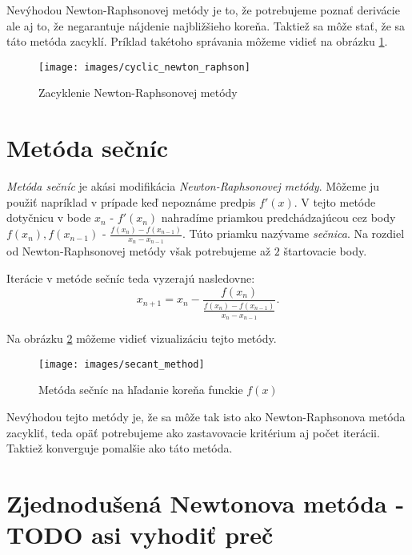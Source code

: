 Nevýhodou Newton-Raphsonovej metódy je to, že potrebujeme poznať derivácie ale aj to, že negarantuje nájdenie
najbližšieho koreňa. Taktiež sa môže stať, že sa táto metóda zacyklí. Príklad takétoho správania môžeme vidieť
na obrázku \ref{obr:cyclic_newton_raphson}.

\begin{figure}
    \centerline{\texttt{[image: images/cyclic\_newton\_raphson]}}
    \caption[Zacyklenie Newton-Raphsonovej metódy]{Zacyklenie Newton-Raphsonovej metódy}
    \label{obr:cyclic_newton_raphson}
\end{figure}

\section{Metóda sečníc}

\textit{Metóda sečníc} je akási modifikácia \textit{Newton-Raphsonovej metódy}. 
Môžeme ju použiť napríklad v prípade keď nepoznáme predpis $f'(x)$. 
V tejto metóde dotyčnicu v bode $x_n$ - $f'(x_n)$ nahradíme priamkou 
predchádzajúcou cez body $f(x_n), f(x_{n-1})$ - $\frac{f(x_n) - f(x_{n-1})}{x_n - x_{n-1}}$. 
Túto priamku nazývame \textit{sečnica}. 
Na rozdiel od Newton-Raphsonovej metódy však potrebujeme až $2$ štartovacie body.

Iterácie v metóde sečníc teda vyzerajú nasledovne:
$$ x_{n+1} = x_n - \frac{f(x_n)}{\frac{f(x_n) - f(x_{n-1})}{x_n - x_{n-1}}}.$$

Na obrázku \ref{obr:secant_method} môžeme vidieť vizualizáciu tejto metódy.

\begin{figure}
    \centerline{\texttt{[image: images/secant\_method]}}
    \caption[Metóda sečníc na hľadanie koreňa funckie $f(x)$]{Metóda sečníc na hľadanie koreňa funckie $f(x)$}
    \label{obr:secant_method}
\end{figure}

Nevýhodou tejto metódy je, že sa môže tak isto ako Newton-Raphsonova metóda zacykliť, teda 
opäť potrebujeme ako zastavovacie kritérium aj počet iterácii. Taktiež konverguje
pomalšie ako táto metóda.

\iffalse
\section{Zjednodušená Newtonova metóda - TODO asi vyhodiť preč}

